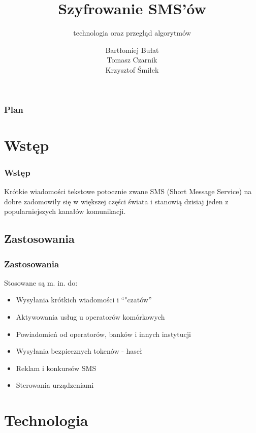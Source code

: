 \documentclass[xcolor=table]{beamer}
\title{Szyfrowanie SMS’ów}
\subtitle{technologia oraz przegląd algorytmów}
\author{Bartłomiej Bułat\\
Tomasz Czarnik\\
Krzysztof Śmiłek\\}
\begin{document}
\begin{frame}
  \titlepage
\end{frame}


\begin{frame}
  \frametitle{Plan}
  \tableofcontents
\end{frame}


\section{Wstęp}

\begin{frame}
  \frametitle{Wstęp}
 Krótkie wiadomości tekstowe potocznie zwane SMS (Short Message Service) na dobre zadomowiły się w większej części świata i stanowią dzisiaj jeden z popularniejszych kanałów komunikacji. 
\end{frame}

\subsection{Zastosowania}
\begin{frame}
  \frametitle{Zastosowania}

Stosowane są m. in. do:
\begin{itemize}
\item Wysyłania krótkich wiadomości i ``"czatów''
\item Aktywowania usług u operatorów komórkowych
\item Powiadomień od operatorów, banków i innych instytucji
\item Wysyłania bezpiecznych tokenów - haseł
\item Reklam i konkursów SMS
\item Sterowania urządzeniami 
\end{itemize}
   
\end{frame}

\section{Technologia}

\end{document}
